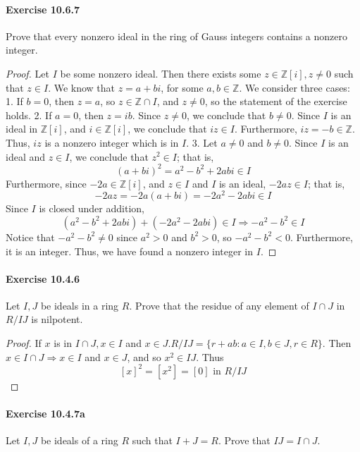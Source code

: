 \documentclass{article}
\begin{document}
\paragraph{Exercise 10.6.7} Prove that every nonzero ideal in the ring of Gauss integers contains a nonzero integer.
\begin{proof}
    Let $I$ be some nonzero ideal. Then there exists some $z \in \mathbb{Z}[i], z \neq 0$ such that $z \in I$. We know that $z=a+b i$, for some $a, b \in \mathbb{Z}$. We consider three cases:
1. If $b=0$, then $z=a$, so $z \in \mathbb{Z} \cap I$, and $z \neq 0$, so the statement of the exercise holds.
2. If $a=0$, then $z=i b$. Since $z \neq 0$, we conclude that $b \neq 0$. Since $I$ is an ideal in $\mathbb{Z}[i]$, and $i \in \mathbb{Z}[i]$, we conclude that $i z \in I$. Furthermore, $i z=-b \in \mathbb{Z}$. Thus, $i z$ is a nonzero integer which is in $I$.
3. Let $a \neq 0$ and $b \neq 0$. Since $I$ is an ideal and $z \in I$, we conclude that $z^2 \in I$; that is,
$$
(a+b i)^2=a^2-b^2+2 a b i \in I
$$
Furthermore, since $-2 a \in \mathbb{Z}[i]$, and $z \in I$ and $I$ is an ideal, $-2 a z \in I$; that is,
$$
-2 a z=-2 a(a+b i)=-2 a^2-2 a b i \in I
$$
Since $I$ is closed under addition,
$$
\left(a^2-b^2+2 a b i\right)+\left(-2 a^2-2 a b i\right) \in I \Longrightarrow-a^2-b^2 \in I
$$
Notice that $-a^2-b^2 \neq 0$ since $a^2>0$ and $b^2>0$, so $-a^2-b^2<0$. Furthermore, it is an integer. Thus, we have found a nonzero integer in $I$.
\end{proof}



\paragraph{Exercise 10.4.6} Let $I, J$ be ideals in a ring $R$. Prove that the residue of any element of $I \cap J$ in $R / I J$ is nilpotent.
\begin{proof}
    If $x$ is in $I \cap J, x \in I$ and $x \in J . R / I J=\{r+a b: a \in I, b \in J, r \in R\}$. Then $x \in I \cap J \Rightarrow x \in I$ and $x \in J$, and so $x^2 \in I J$. Thus
$$
[x]^2=\left[x^2\right]=[0] \text { in } R / I J
$$
\end{proof}



\paragraph{Exercise 10.4.7a} Let $I, J$ be ideals of a ring $R$ such that $I+J=R$. Prove that $I J=I \cap J$.
\end{document}
